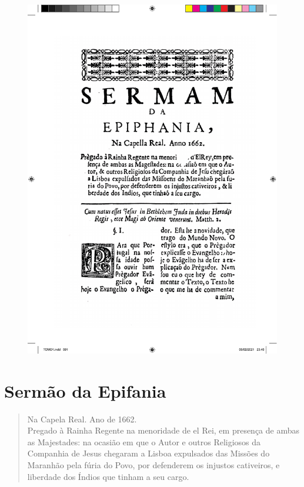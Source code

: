 \pagebreak
\thispagestyle{empty}
\movetoevenpage
\begin{figure}
\includegraphics[width=\textwidth]{./imgs/epifania.pdf}  
\end{figure}

\chapter{Sermão da Epifania}


\begin{quotation}
\noindent{}Na Capela Real. Ano de 1662.\\
Pregado à Rainha Regente na menoridade de el Rei, em presença
de ambas as Majestades: na ocasião em que o Autor e outros
Religiosos da Companhia de Jesus chegaram a Lisboa expulsados
das Missões do Maranhão pela fúria do Povo, por defenderem
os injustos cativeiros, e liberdade dos Índios que tinham a
seu cargo.
\end{quotation}


